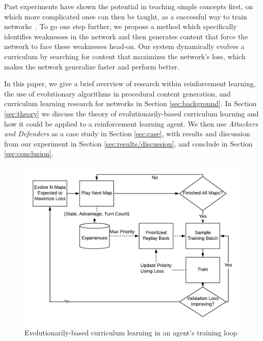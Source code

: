 \documentclass[letterpaper]{article} %
\begin{document}
Past experiments have shown the potential in teaching simple concepts first, on which more complicated ones can then be taught, as a successful way to train networks~\cite{elman1993learning}. To go one step further, we propose a method which specifically identifies weaknesses in the network and then generates content that force the network to face these weaknesses head-on. Our system dynamically evolves a curriculum by searching for content that maximizes the network's loss, which makes the network generalize faster and perform better.

In this paper, we give a brief overview of research within reinforcement learning, the use of evolutionary algorithms in procedural content generation, and curriculum learning research for networks in Section \ref{sec:background}. In Section \ref{sec:theory} we discuss the theory of evolutionarily-based curriculum learning and how it could be applied to a reinforcement learning agent. We then use \emph{Attackers and Defenders} as a case study in Section \ref{sec:case}, with results and discussion from our experiment in Section \ref{sec:results/discussion}, and conclude in Section \ref{sec:conclusion}.

\begin{figure}[tp]
\begin{center}
\includegraphics[width=\linewidth]{graphics/training-loop.png}
\caption{Evolutionarily-based curriculum learning in an agent's training loop}
\label{fig:training-loop}
\end{center}
\end{figure}
\end{document}
